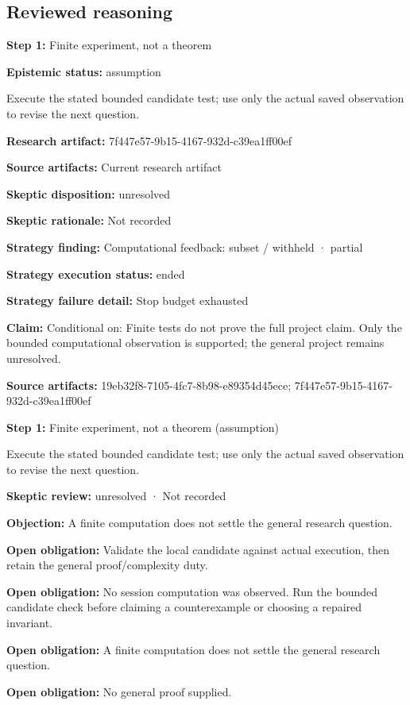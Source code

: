 \documentclass[11pt]{article}
\begin{document}
\subsection{Reviewed reasoning}
\textbf{Step 1:} Finite experiment, not a theorem\par
\textbf{Epistemic status:} assumption\par
Execute the stated bounded candidate test; use only the actual saved observation to revise the next question.\par
\textbf{Research artifact:} 7f447e57-9b15-4167-932d-c39ea1ff00ef\par
\textbf{Source artifacts:} Current research artifact\par
\textbf{Skeptic disposition:} unresolved\par
\textbf{Skeptic rationale:} Not recorded\par
\textbf{Strategy finding:} Computational feedback: subset / withheld · partial\par
\textbf{Strategy execution status:} ended\par
\textbf{Strategy failure detail:} Stop budget exhausted\par
\textbf{Claim:} Conditional on: Finite tests do not prove the full project claim. Only the bounded computational observation is supported; the general project remains unresolved.\par
\textbf{Source artifacts:} 19eb32f8-7105-4fc7-8b98-e89354d45ece; 7f447e57-9b15-4167-932d-c39ea1ff00ef\par
\textbf{Step 1:} Finite experiment, not a theorem (assumption)\par
Execute the stated bounded candidate test; use only the actual saved observation to revise the next question.\par
\textbf{Skeptic review:} unresolved · Not recorded\par
\textbf{Objection:} A finite computation does not settle the general research question.\par
\textbf{Open obligation:} Validate the local candidate against actual execution, then retain the general proof/complexity duty.\par
\textbf{Open obligation:} No session computation was observed. Run the bounded candidate check before claiming a counterexample or choosing a repaired invariant.\par
\textbf{Open obligation:} A finite computation does not settle the general research question.\par
\textbf{Open obligation:} No general proof supplied.\par
\end{document}
